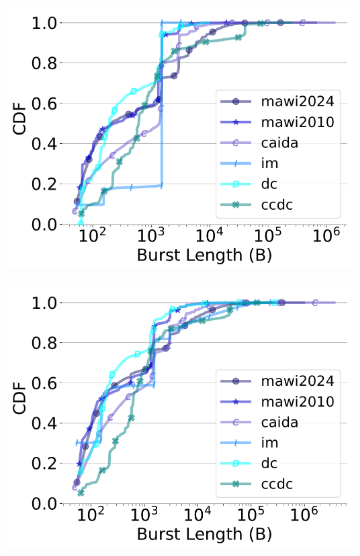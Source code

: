 \begin{figure}[t]
 \centering
\begin{subfigure}[t]{.24\linewidth}
    \includegraphics[width=\linewidth]{figs/aggregate_ipg_burstsize_cdf_10.pdf}
    \vspace{-6mm}
 \end{subfigure}
\begin{subfigure}[t]{.24\linewidth}
 \centering
    \includegraphics[width=\linewidth]{figs/aggregate_ipg_burstsize_cdf_50.pdf}
    \vspace{-6mm}
\end{subfigure}
\begin{subfigure}[t]{.24\linewidth}
 \centering

\end{subfigure}
\end{figure}
